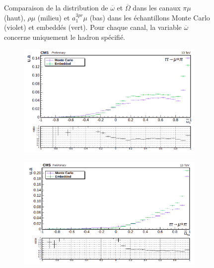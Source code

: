 \begin{figure}
\begin{subfigure}[b]{0.5\linewidth}
    \caption*{} 
    \vspace{0.5ex}
  \end{subfigure}
  \caption{Comparaison de la distribution de $\overline{\omega}$ et $\overline{\Omega}$ dans les canaux $\pi\mu$ (haut), $\rho\mu$ (milieu) et $a_1^{3pr}\mu$ (bas) dans les échantillons Monte Carlo (violet) et embeddés (vert). Pour chaque canal, la variable $\overline{\omega}$ concerne uniquement le hadron spécifié.}
  \label{omegabar_tautau}
\end{figure}

\begin{figure}
    \begin{subfigure}[b]{0.5\linewidth}
    \centering
    \includegraphics[width=\linewidth]{Chapitre6/Images/OptVar/omegabar_pi_pimu.png} 
    \caption*{} 
    \vspace{10mm}
  \end{subfigure}%
  \begin{subfigure}[b]{0.5\linewidth}
    \centering
    \includegraphics[width=\linewidth]{Chapitre6/Images/OptVar/Omegabar_pimu.png} 
    \caption*{} 
    \vspace{10mm}
  \end{subfigure}


\end{figure}
